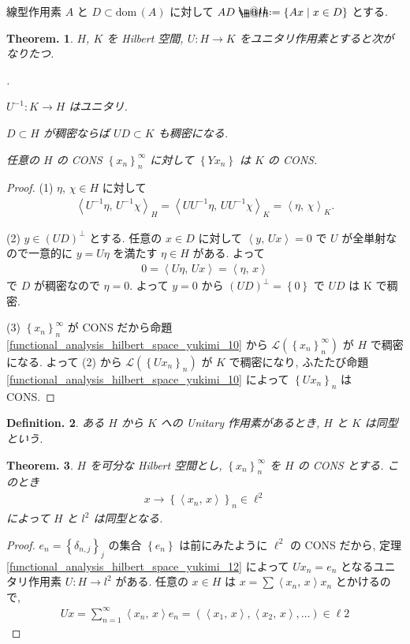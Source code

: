 \documentclass[openany, a4paper, oneside]{jsbook}
\makeatletter
\newcounter{enum2}
\renewenvironment{enumerate}{%
\begin{list}%
{%
\arabic{enum2}.\ \,%
}%
{%
\usecounter{enum2}
\setlength{\itemindent}{0pt}%
\setlength{\leftmargin}{15pt}%
\setlength{\rightmargin}{0pt}%
\setlength{\labelsep}{0pt}%
\setlength{\labelwidth}{6pt}%
\setlength{\itemsep}{0pt}%
\setlength{\parsep}{0pt}%
\setlength{\listparindent}{0pt}%
}
}{%
\end{list}%
}
\newcommand*{\defeq}{\mathrel{\rlap{%
\raisebox{0.3ex}{$\m@th\cdot$}}%
\raisebox{-0.3ex}{$\m@th\cdot$}}%
=}
\newcommand{\dom}{\mathrm{dom}\,}
\theoremstyle{break}
\newtheorem{thm}{Theorem.}[section]
\theoremstyle{breakdefn}
\newtheorem{defn}[thm]{Definition.}
\newcommand{\rbk}[1]{\left (#1\right)}
\newcommand{\cbk}[1]{\left\{#1\right\}}
\newcommand{\bkt}[2]{\left\langle#1,\,#2\right\rangle}
\newcommand{\relmiddle}[1]{\mathrel{}\middle#1\mathrel{}}
\newcommand{\set}[2]{\left\{#1 \relmiddle| #2\right\}}
\newcommand{\calL}{\mathcal{L}}
\makeatother
\begin{document}
線型作用素 $A$ と $D \subset \dom (A)$ に対して $AD \defeq \set{Ax}{x \in D}$ とする.
\begin{thm}
 $H$, $K$ を Hilbert 空間, $U \colon H \to K$ をユニタリ作用素とすると次がなりたつ.
\begin{enumerate}
\item $U^{-1} \colon K \to H$ はユニタリ.
\item $D \subset H$ が稠密ならば $U D \subset K$ も稠密になる.
\item 任意の $H$ の CONS $\cbk{x_n}_n^\infty$ に対して $\cbk{Yx_n}$ は $K$ の CONS.
\end{enumerate}
\end{thm}
\begin{proof}
(1) $\eta$, $\chi \in H$ に対して
\begin{align}
 \bkt{U^{-1} \eta}{U^{-1} \chi}_H
 =
 \bkt{U U^{-1} \eta}{U U^{-1} \chi}_K
 =
 \bkt{\eta}{\chi}_K.
\end{align}

(2) $y \in (UD)^\perp$ とする.
任意の $x \in D$ に対して $\bkt{y}{Ux} = 0$ で $U$ が全単射なので一意的に $y = U\eta$ を満たす $\eta \in H$ がある.
よって
\begin{align}
 0
 =
 \bkt{U \eta}{Ux}
 =
 \bkt{\eta}{x}
\end{align}
で $D$ が稠密なので $\eta = 0$.
よって $y = 0$ から $(UD)^\perp = \cbk{0}$ で $UD$ は K で稠密.

(3) $\cbk{x_n}_n^\infty$ が CONS だから命題 \ref{functional_analysis_hilbert_space_yukimi_10} から
$\calL (\cbk{x_n}_n^\infty)$ が $H$ で稠密になる.
よって (2) から $\calL (\cbk{Ux_n}_n)$ が $K$ で稠密になり,
ふたたび命題 \ref{functional_analysis_hilbert_space_yukimi_10} によって $\cbk{Ux_n}_n$ は CONS.
\end{proof}

\begin{defn}
 ある $H$ から $K$ への Unitary 作用素があるとき, $H$ と $K$ は同型という.
\end{defn}
\begin{thm}\label{functional_analysis_hilbert_space_yukimi_14}
 $H$ を可分な Hilbert 空間とし, $\cbk{x_n}_n^\infty$ を $H$ の CONS とする.
 このとき
 \begin{align}
  x \to \cbk{\bkt{x_n}{x}}_n \in \ell^2
 \end{align}
 によって $H$ と $l^2$ は同型となる.
\end{thm}
\begin{proof}
$e_n = \cbk{\delta_{n,j}}_j$ の集合 $\cbk{e_n}$ は前にみたように $\ell^2$ の CONS だから,
定理 \ref{functional_analysis_hilbert_space_yukimi_12} によって $Ux_n = e_n$ となるユニタリ作用素 $U \colon H \to l^2$ がある.
任意の $x\in H$ は $x = \sum \bkt{x_n}{x} x_n$ とかけるので,
\begin{align}
 Ux
 =
 \sum_{n=1}^{\infty} \bkt{x_n}{x} e_n
 =
 \rbk{\bkt{x_1}{x}, \bkt{x_2}{x}, \dots} \in \ell2
\end{align}
\end{proof}
\end{document}
